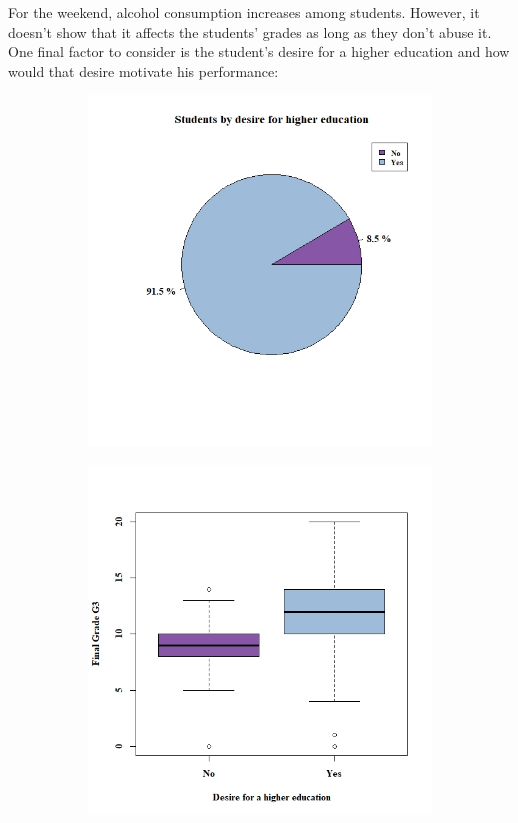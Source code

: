 \documentclass[a4paper, 11pt]{article}
\begin{document}
	For the weekend, alcohol consumption increases among students. However, it doesn't show that it affects the students' grades as long as they don't abuse it.
	\\
	
	One final factor to consider is the student's desire for a higher education and how would that desire motivate his performance:
	
	\begin{figure}[h!]
		\centering
		\begin{subfigure}[b]{0.2\linewidth}
			\hspace*{-1.6in}
			\includegraphics[width=2.0\linewidth]{higher.jpeg}
		\end{subfigure}
		\begin{subfigure}[b]{0.2\linewidth}
			\includegraphics[width=2.0\linewidth]{higher_grades.jpeg}

\end{subfigure}
\end{figure}
\end{document}
